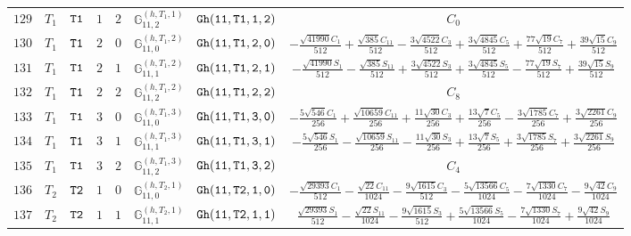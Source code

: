 \documentclass[fleqn,8pt]{jsarticle}
\begin{document}
\begin{table}[ht!]
\begin{center}
\begin{tabular}{cccccccc}
$ 129 $ & $ T_{1} $ & $ {\tt T1} $ & $ 1 $ & $ 2 $ & $ \mathbb{G}_{11,2}^{(h,T_{1},1)} $ & $ {\tt Gh(11,T1,1,2)} $ & $ C_{0} $ \\
$ 130 $ & $ T_{1} $ & $ {\tt T1} $ & $ 2 $ & $ 0 $ & $ \mathbb{G}_{11,0}^{(h,T_{1},2)} $ & $ {\tt Gh(11,T1,2,0)} $ & $ - \frac{\sqrt{41990} C_{1}}{512} + \frac{\sqrt{385} C_{11}}{512} - \frac{3 \sqrt{4522} C_{3}}{512} + \frac{3 \sqrt{4845} C_{5}}{512} + \frac{77 \sqrt{19} C_{7}}{512} + \frac{39 \sqrt{15} C_{9}}{512} $ \\
$ 131 $ & $ T_{1} $ & $ {\tt T1} $ & $ 2 $ & $ 1 $ & $ \mathbb{G}_{11,1}^{(h,T_{1},2)} $ & $ {\tt Gh(11,T1,2,1)} $ & $ - \frac{\sqrt{41990} S_{1}}{512} - \frac{\sqrt{385} S_{11}}{512} + \frac{3 \sqrt{4522} S_{3}}{512} + \frac{3 \sqrt{4845} S_{5}}{512} - \frac{77 \sqrt{19} S_{7}}{512} + \frac{39 \sqrt{15} S_{9}}{512} $ \\
$ 132 $ & $ T_{1} $ & $ {\tt T1} $ & $ 2 $ & $ 2 $ & $ \mathbb{G}_{11,2}^{(h,T_{1},2)} $ & $ {\tt Gh(11,T1,2,2)} $ & $ C_{8} $ \\
$ 133 $ & $ T_{1} $ & $ {\tt T1} $ & $ 3 $ & $ 0 $ & $ \mathbb{G}_{11,0}^{(h,T_{1},3)} $ & $ {\tt Gh(11,T1,3,0)} $ & $ - \frac{5 \sqrt{546} C_{1}}{256} + \frac{\sqrt{10659} C_{11}}{256} + \frac{11 \sqrt{30} C_{3}}{256} + \frac{13 \sqrt{7} C_{5}}{256} - \frac{3 \sqrt{1785} C_{7}}{256} + \frac{3 \sqrt{2261} C_{9}}{256} $ \\
$ 134 $ & $ T_{1} $ & $ {\tt T1} $ & $ 3 $ & $ 1 $ & $ \mathbb{G}_{11,1}^{(h,T_{1},3)} $ & $ {\tt Gh(11,T1,3,1)} $ & $ - \frac{5 \sqrt{546} S_{1}}{256} - \frac{\sqrt{10659} S_{11}}{256} - \frac{11 \sqrt{30} S_{3}}{256} + \frac{13 \sqrt{7} S_{5}}{256} + \frac{3 \sqrt{1785} S_{7}}{256} + \frac{3 \sqrt{2261} S_{9}}{256} $ \\
$ 135 $ & $ T_{1} $ & $ {\tt T1} $ & $ 3 $ & $ 2 $ & $ \mathbb{G}_{11,2}^{(h,T_{1},3)} $ & $ {\tt Gh(11,T1,3,2)} $ & $ C_{4} $ \\
$ 136 $ & $ T_{2} $ & $ {\tt T2} $ & $ 1 $ & $ 0 $ & $ \mathbb{G}_{11,0}^{(h,T_{2},1)} $ & $ {\tt Gh(11,T2,1,0)} $ & $ - \frac{\sqrt{29393} C_{1}}{512} - \frac{\sqrt{22} C_{11}}{1024} - \frac{9 \sqrt{1615} C_{3}}{512} - \frac{5 \sqrt{13566} C_{5}}{1024} - \frac{7 \sqrt{1330} C_{7}}{1024} - \frac{9 \sqrt{42} C_{9}}{1024} $ \\
$ 137 $ & $ T_{2} $ & $ {\tt T2} $ & $ 1 $ & $ 1 $ & $ \mathbb{G}_{11,1}^{(h,T_{2},1)} $ & $ {\tt Gh(11,T2,1,1)} $ & $ \frac{\sqrt{29393} S_{1}}{512} - \frac{\sqrt{22} S_{11}}{1024} - \frac{9 \sqrt{1615} S_{3}}{512} + \frac{5 \sqrt{13566} S_{5}}{1024} - \frac{7 \sqrt{1330} S_{7}}{1024} + \frac{9 \sqrt{42} S_{9}}{1024} $ \\

\end{tabular}
\end{center}
\end{table}
\end{document}
